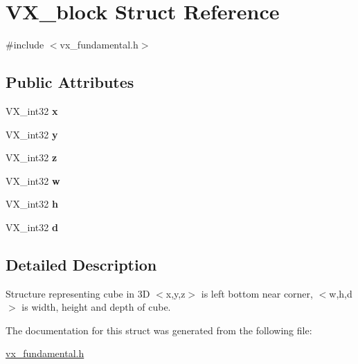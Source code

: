 \hypertarget{structVX__block}{\section{V\-X\-\_\-block Struct Reference}
\label{structVX__block}
}


{\ttfamily \#include $<$vx\-\_\-fundamental.\-h$>$}

\subsection*{Public Attributes}
\begin{DoxyCompactItemize}
\item 
\hypertarget{structVX__block_a944e09122538c4c462fa81f734ef36ea}{V\-X\-\_\-int32 {\bfseries x}}\label{structVX__block_a944e09122538c4c462fa81f734ef36ea}

\item 
\hypertarget{structVX__block_aaf15c5611be4611f95e76c4109145474}{V\-X\-\_\-int32 {\bfseries y}}\label{structVX__block_aaf15c5611be4611f95e76c4109145474}

\item 
\hypertarget{structVX__block_af8bf35d164bff4cb76b2ad9b180e753d}{V\-X\-\_\-int32 {\bfseries z}}\label{structVX__block_af8bf35d164bff4cb76b2ad9b180e753d}

\item 
\hypertarget{structVX__block_a444af8731f0d548d955a1f09a86bf9f8}{V\-X\-\_\-int32 {\bfseries w}}\label{structVX__block_a444af8731f0d548d955a1f09a86bf9f8}

\item 
\hypertarget{structVX__block_a95ecff93c6b37f888e5fadb6c55b5715}{V\-X\-\_\-int32 {\bfseries h}}\label{structVX__block_a95ecff93c6b37f888e5fadb6c55b5715}

\item 
\hypertarget{structVX__block_a27fa11939a3ae226dfab6438d9cf8378}{V\-X\-\_\-int32 {\bfseries d}}\label{structVX__block_a27fa11939a3ae226dfab6438d9cf8378}

\end{DoxyCompactItemize}


\subsection{Detailed Description}
Structure representing cube in 3\-D $<$x,y,z$>$ is left bottom near corner, $<$w,h,d$>$ is width, height and depth of cube. 

The documentation for this struct was generated from the following file\-:\begin{DoxyCompactItemize}
\item 
\hyperlink{vx__fundamental_8h}{vx\-\_\-fundamental.\-h}\end{DoxyCompactItemize}
